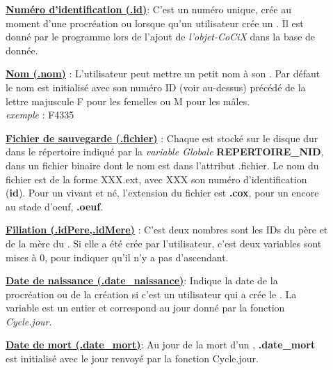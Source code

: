 \documentclass[french]{report}
\begin{document}
\begin{description}

\item[]\textbf{\underline{Numéro d'identification (.id)}}: C'est un numéro unique, crée au moment d'une procréation ou lorsque qu'un utilisateur crée un \CoCiX. Il est donné par le programme lors de l'ajout de \textit{l'objet-CoCiX} dans la base de donnée.\\

\item[]\textbf{\underline{Nom (.nom)}} : L'utilisateur peut mettre un petit nom à son \CoCiX. Par défaut le nom est initialisé avec son numéro ID (voir au-dessus) précédé de la lettre majuscule F pour les femelles ou M pour les mâles.\\
\textit{exemple }: 
F4335\\

\item[]\textbf{\underline{Fichier de sauvegarde (.fichier)}} : Chaque \CoCiX est stocké sur le disque dur dans le répertoire indiqué par la \textit{variable Globale} \textbf{REPERTOIRE\_NID}, dans un fichier binaire dont le nom est dans l'attribut .fichier. Le nom du fichier est de la forme XXX.ext, avec XXX son numéro d'identification (\textbf{id}). Pour un \CoCiX vivant et né, l'extension du fichier est \textbf{.cox}, pour un \CoCiX encore au stade d'oeuf, \textbf{.oeuf}.\\


\item[]\textbf{\underline{Filiation (.idPere,.idMere)}} : C'est deux nombres sont les IDs du père et de la mère du \CoCiX. Si elle a été crée par l'utilisateur, c'est deux variables sont mises à 0, pour indiquer qu'il n'y a pas d'ascendant.\\

\item[]\textbf{\underline{Date de naissance (.date\_naissance)}}: Indique la date de la procréation ou de la création si c'est un utilisateur qui a crée le \CoCiX. La variable est un entier et correspond au jour donné par la fonction \textit{Cycle.jour}.\\

\item[]\textbf{\underline{Date de mort (.date\_mort)}}: Au jour de la mort d'un \CoCiX, \textbf{.date\_mort} est initialisé avec le jour renvoyé par la fonction Cycle.jour.\\
 

\end{description}
\end{document}
